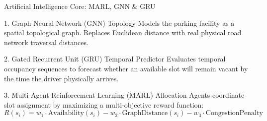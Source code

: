 \documentclass[aspectratio=169]{beamer}
\begin{document}
\begin{frame}{Artificial Intelligence Core: MARL, GNN \& GRU}
    \begin{block}{1. Graph Neural Network (GNN) Topology}
        Models the parking facility as a spatial topological graph. Replaces Euclidean distance with real physical road network traversal distances.
    \end{block}
    
    \begin{block}{2. Gated Recurrent Unit (GRU) Temporal Predictor}
        Evaluates temporal occupancy sequences to forecast whether an available slot will remain vacant by the time the driver physically arrives.
    \end{block}
    
    \begin{block}{3. Multi-Agent Reinforcement Learning (MARL) Allocation}
        Agents coordinate slot assignment by maximizing a multi-objective reward function:
        \vspace{-0.1cm}
        \[
            R(s_i) = w_1 \cdot \text{Availability}(s_i) - w_2 \cdot \text{GraphDistance}(s_i) - w_3 \cdot \text{CongestionPenalty}
        \]
    \end{block}
\end{frame}
\end{document}
